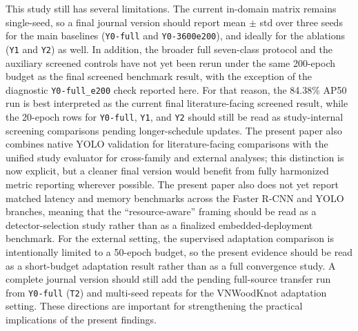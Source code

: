 This study still has several limitations. The current in-domain matrix remains single-seed, so a final journal version should report mean $\pm$ std over three seeds for the main baselines (\texttt{Y0-full} and \texttt{Y0-3600e200}), and ideally for the ablations (\texttt{Y1} and \texttt{Y2}) as well. In addition, the broader full seven-class protocol and the auxiliary screened controls have not yet been rerun under the same 200-epoch budget as the final screened benchmark result, with the exception of the diagnostic \texttt{Y0-full\_e200} check reported here. For that reason, the 84.38\% AP50 run is best interpreted as the current final literature-facing screened result, while the 20-epoch rows for \texttt{Y0-full}, \texttt{Y1}, and \texttt{Y2} should still be read as study-internal screening comparisons pending longer-schedule updates. The present paper also combines native YOLO validation for literature-facing comparisons with the unified study evaluator for cross-family and external analyses; this distinction is now explicit, but a cleaner final version would benefit from fully harmonized metric reporting wherever possible. The present paper also does not yet report matched latency and memory benchmarks across the Faster R-CNN and YOLO branches, meaning that the ``resource-aware'' framing should be read as a detector-selection study rather than as a finalized embedded-deployment benchmark. For the external setting, the supervised adaptation comparison is intentionally limited to a 50-epoch budget, so the present evidence should be read as a short-budget adaptation result rather than as a full convergence study. A complete journal version should still add the pending full-source transfer run from \texttt{Y0-full} (\texttt{T2}) and multi-seed repeats for the VNWoodKnot adaptation setting. These directions are important for strengthening the practical implications of the present findings.
